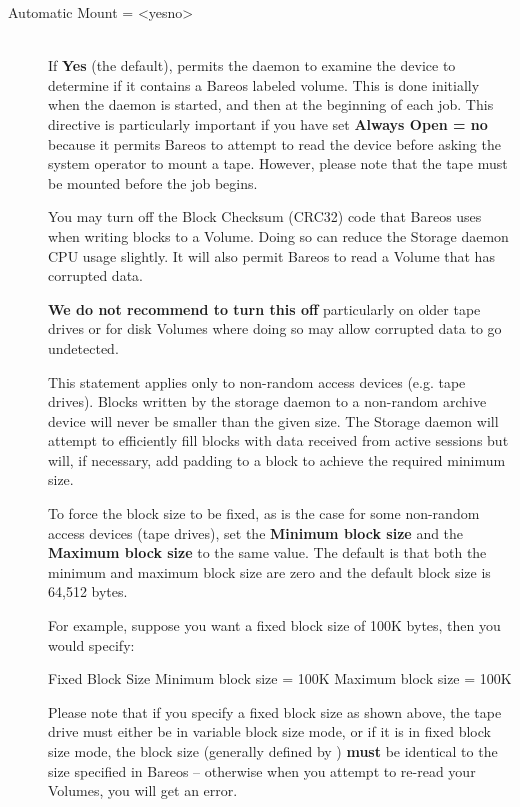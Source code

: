 \begin{description}
\item [Automatic Mount = {\textless}yes{\textbar}no{\textgreater}] \hfill \\
If {\bf Yes} (the default), permits the daemon to examine the device to
determine if it contains a Bareos labeled volume.  This is done
initially when the daemon is started, and then at the beginning of each
job.  This directive is particularly important if you have set
{\bf Always Open = no} because it permits Bareos to attempt to read the
device before asking the system operator to mount a tape.  However,
please note that the tape must be mounted before the job begins.


You may turn off the Block Checksum (CRC32) code that Bareos uses when
writing blocks to a Volume. Doing so can reduce the Storage daemon CPU usage
slightly.  It will also permit Bareos to read a Volume that has corrupted
data.

\textbf{We do not recommend to turn this off} particularly on older tape
drives or for disk Volumes where doing so may allow corrupted data to go
undetected.

%
\label{storage-device-minimumblocksize}%
This statement applies only to non-random access devices (e.g.
tape drives).  Blocks written by the storage daemon to a non-random
archive device will never be smaller than the given size.
The Storage daemon will attempt to efficiently fill blocks with data
received from active sessions but will, if necessary, add padding to a
block to achieve the required minimum size.

To force the block size to be fixed, as is the case for some non-random
access devices (tape drives), set the {\bf Minimum block size} and the
{\bf Maximum block size} to the same value.  The default
is that both the minimum and maximum block size are zero and the default
block size is 64,512 bytes.

For  example, suppose you want a fixed block size of 100K bytes, then you
would specify:

\begin{bconfig}{Fixed Block Size}
Minimum block size = 100K
Maximum block size = 100K
\end{bconfig}

Please note that if you specify a fixed block size as shown above,  the tape
drive must either be in variable block size mode, or  if it is in fixed block
size mode, the block size (generally  defined by ) {\bf must} be
identical to the size specified  in Bareos -- otherwise when you attempt to
re-read your Volumes,  you will get an error.


\end{description}
